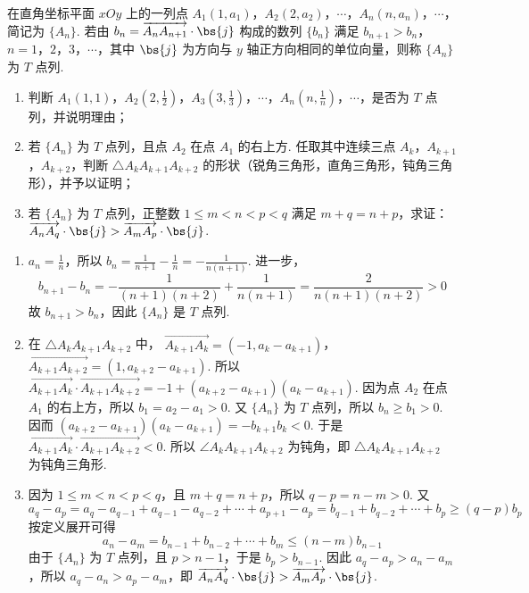 \begin{problem}
在直角坐标平面 \(xOy\) 上的一列点 \(A_1(1,a_1)\)，\(A_2(2,a_2)\)，\(\cdots\)，\(A_n(n,a_n)\)，\(\cdots\)，简记为 \(\{A_n\}\). 若由 \(b_n=\overrightarrow{A_nA_{n+1}}\cdot\bs{j}\) 构成的数列 \(\{b_n\}\) 满足 \(b_{n+1}>b_n\)，\(n=1\)，\(2\)，\(3\)，\(\cdots\)，其中 \(\bs{j}\) 为方向与 \(y\) 轴正方向相同的单位向量，则称 \(\{A_n\}\) 为 \(T\) 点列.

\begin{enumerate}
\item 判断 \(A_1(1,1)\)，\(A_2\left(2,\frac{1}{2}\right)\)，\(A_3\left(3,\frac{1}{3}\right)\)，\(\cdots\)，\(A_n\left(n,\frac{1}{n}\right)\)，\(\cdots\)，是否为 \(T\) 点列，并说明理由；
\item 若 \(\{A_n\}\) 为 \(T\) 点列，且点 \(A_2\) 在点 \(A_1\) 的右上方. 任取其中连续三点 \(A_k\)，\(A_{k+1}\)，\(A_{k+2}\)，判断 \(\triangle A_kA_{k+1}A_{k+2}\) 的形状（锐角三角形，直角三角形，钝角三角形），并予以证明；
\item 若 \(\{A_n\}\) 为 \(T\) 点列，正整数 \(1\leqslant m<n<p<q\) 满足 \(m+q=n+p\)，求证：\(\overrightarrow{A_nA_q}\cdot\bs{j}>\overrightarrow{A_mA_p}\cdot\bs{j}\).
\end{enumerate}
\end{problem}

\begin{solution}
\begin{enumerate}
\item \(a_n=\frac{1}{n}\)，所以
\(b_n=\frac{1}{n+1}-\frac{1}{n}=-\frac{1}{n(n+1)}\). 进一步，
\[
b_{n+1}-b_n=-\frac{1}{(n+1)(n+2)}+\frac{1}{n(n+1)}=\frac{2}{n(n+1)(n+2)}>0
\]
故 \(b_{n+1}>b_n\)，因此 \(\{A_n\}\) 是 \(T\) 点列.

\item 在 \(\triangle A_kA_{k+1}A_{k+2}\) 中，
\(\overrightarrow{A_{k+1}A_k}=(-1,a_k-a_{k+1})\)，\(\overrightarrow{A_{k+1}A_{k+2}}=(1,a_{k+2}-a_{k+1})\).
所以
\(\overrightarrow{A_{k+1}A_k}\cdot\overrightarrow{A_{k+1}A_{k+2}}=-1+(a_{k+2}-a_{k+1})(a_k-a_{k+1})\).
因为点 \(A_2\) 在点 \(A_1\) 的右上方，所以
\(b_1=a_2-a_1>0\).
又 \(\{A_n\}\) 为 \(T\) 点列，所以 \(b_n\geqslant b_1>0\). 因而
\((a_{k+2}-a_{k+1})(a_k-a_{k+1})=-b_{k+1}b_k<0\).
于是
\(\overrightarrow{A_{k+1}A_k}\cdot\overrightarrow{A_{k+1}A_{k+2}}<0\).
所以 \(\angle A_kA_{k+1}A_{k+2}\) 为钝角，即 \(\triangle A_kA_{k+1}A_{k+2}\) 为钝角三角形.

\item 因为 \(1\leqslant m<n<p<q\)，且 \(m+q=n+p\)，所以
\(q-p=n-m>0\).
又
\[
a_q-a_p=a_q-a_{q-1}+a_{q-1}-a_{q-2}+\cdots+a_{p+1}-a_p=b_{q-1}+b_{q-2}+\cdots+b_p\geqslant (q-p)b_p
\]
按定义展开可得
\[
a_n-a_m=b_{n-1}+b_{n-2}+\cdots+b_m\leqslant (n-m)b_{n-1}
\]
由于 \(\{A_n\}\) 为 \(T\) 点列，且 \(p>n-1\)，于是 \(b_p>b_{n-1}\). 因此 \(a_q-a_p>a_n-a_m\)，所以 \(a_q-a_n>a_p-a_m\)，即 \(\overrightarrow{A_nA_q}\cdot\bs{j}>\overrightarrow{A_mA_p}\cdot\bs{j}\).
\end{enumerate}
\end{solution}

